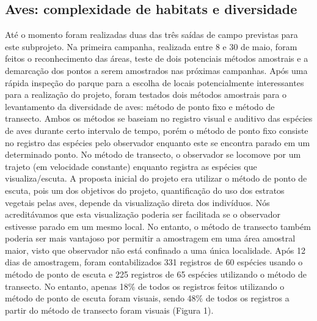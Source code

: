 \subsection{Aves: complexidade de habitats e diversidade} %
\label{sec:compl-de-habit} 


Até o momento foram realizadas duas das três saídas de campo previstas para este subprojeto. Na primeira campanha, realizada entre 8 e 30 de maio, foram feitos o reconhecimento das áreas, teste de dois potenciais métodos amostrais e a demarcação dos pontos a serem amostrados nas próximas campanhas. Após uma rápida inspeção do parque para a escolha de locais potencialmente interessantes para a realização do projeto, foram testados dois métodos amostrais para o levantamento da diversidade de aves: método de ponto fixo e método de transecto. Ambos os métodos se baseiam no registro visual e auditivo das espécies de aves durante certo intervalo de tempo, porém o método de ponto fixo consiste no registro das espécies pelo observador enquanto este se encontra parado em um determinado ponto. No método de transecto, o observador se locomove por um trajeto (em velocidade constante) enquanto registra as espécies que visualiza/escuta.
A proposta inicial do projeto era utilizar o método de ponto de escuta, pois um dos objetivos do projeto, quantificação do uso dos estratos vegetais pelas aves, depende da visualização direta dos indivíduos. Nós acreditávamos que esta visualização poderia ser facilitada se o observador estivesse parado em um mesmo local. No entanto, o método de transecto também poderia ser mais vantajoso por permitir a amostragem em uma área amostral maior, visto que observador não está confinado a uma única localidade. Após 12 dias de amostragem, foram contabilizados 331 registros de 60 espécies usando o método de ponto de escuta e 225 registros de 65 espécies utilizando o método de transecto. No entanto, apenas 18\% de todos os registros feitos utilizando o método de ponto de escuta foram visuais, sendo 48\% de todos os registros a partir do método de transecto foram visuais (Figura 1).
